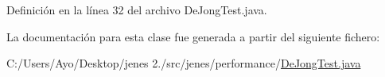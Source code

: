 Definición en la línea 32 del archivo De\-Jong\-Test.\-java.



La documentación para esta clase fue generada a partir del siguiente fichero\-:\begin{DoxyCompactItemize}
\item 
C\-:/\-Users/\-Ayo/\-Desktop/jenes 2./src/jenes/performance/\hyperlink{_de_jong_test_8java}{De\-Jong\-Test.\-java}\end{DoxyCompactItemize}
